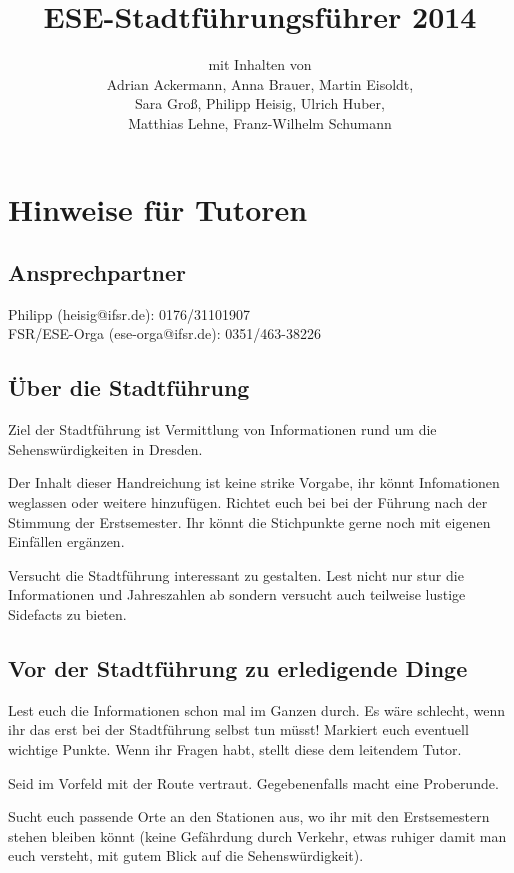 \documentclass[a4paper,12pt]{report}
\begin{document}
\title{\textbf{ESE-Stadtführungsführer 2014}\\}
\date{}
\author{mit Inhalten von\\Adrian Ackermann, Anna Brauer, Martin Eisoldt,\\Sara Groß, Philipp Heisig, Ulrich Huber,\\ Matthias Lehne, Franz-Wilhelm Schumann}
\maketitle

\chapter{Hinweise für Tutoren}
\section{Ansprechpartner}
Philipp (heisig@ifsr.de): 0176/31101907\\
FSR/ESE-Orga (ese-orga@ifsr.de): 0351/463-38226

\section{Über die Stadtführung}
\begin{itemize*}
\item Ziel der Stadtführung ist Vermittlung von Informationen rund um die Sehenswürdigkeiten in Dresden.
\item Der Inhalt dieser Handreichung ist keine strike Vorgabe, ihr könnt Infomationen weglassen oder weitere hinzufügen.
Richtet euch bei bei der Führung nach der Stimmung der Erstsemester.
Ihr könnt die Stichpunkte gerne noch mit eigenen Einfällen ergänzen.
\item Versucht die Stadtführung interessant zu gestalten. Lest nicht nur stur die Informationen und Jahreszahlen ab sondern versucht auch teilweise lustige Sidefacts zu bieten.
\end{itemize*}

\section{Vor der Stadtführung zu erledigende Dinge}
\begin{itemize*}
\item Lest euch die Informationen schon mal im Ganzen durch.
Es wäre schlecht, wenn ihr das erst bei der Stadtführung selbst tun müsst!
Markiert euch eventuell wichtige Punkte.
Wenn ihr Fragen habt, stellt diese dem leitendem Tutor.
\item Seid im Vorfeld mit der Route vertraut. Gegebenenfalls macht eine Proberunde.
\item Sucht euch passende Orte an den Stationen aus, wo ihr mit den Erstsemestern stehen bleiben könnt (keine Gefährdung durch Verkehr, etwas ruhiger damit man euch versteht, mit gutem Blick auf die Sehenswürdigkeit).
\end{itemize*}
\end{document}
